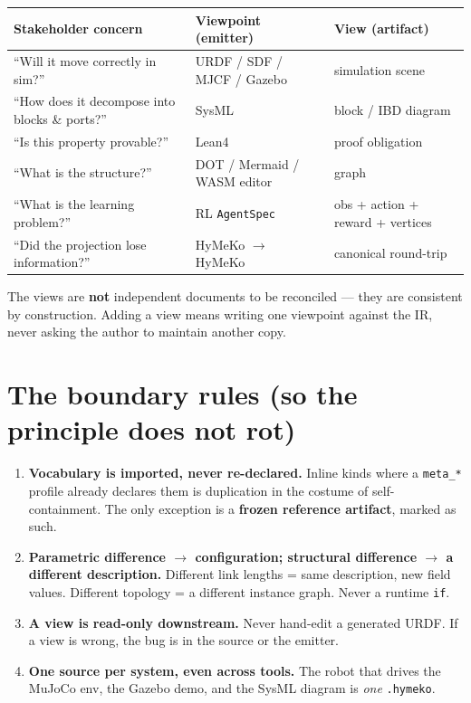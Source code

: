 \documentclass[11pt]{article}
\newcommand{\code}[1]{\texttt{\small #1}}
\begin{document}
\begin{center}\small
\begin{tabular}{@{}p{5.6cm}p{4.0cm}p{4.6cm}@{}}
\toprule
\textbf{Stakeholder concern} & \textbf{Viewpoint (emitter)} & \textbf{View (artifact)} \\
\midrule
``Will it move correctly in sim?'' & URDF / SDF / MJCF / Gazebo & simulation scene \\
``How does it decompose into blocks \& ports?'' & SysML & block / IBD diagram \\
``Is this property provable?'' & Lean4 & proof obligation \\
``What is the structure?'' & DOT / Mermaid / WASM editor & graph \\
``What is the learning problem?'' & RL \code{AgentSpec} & obs + action + reward + vertices \\
``Did the projection lose information?'' & HyMeKo $\to$ HyMeKo & canonical round-trip \\
\bottomrule
\end{tabular}
\end{center}

The views are \textbf{not} independent documents to be reconciled --- they are consistent by
construction. Adding a view means writing one viewpoint against the IR, never asking the author to
maintain another copy.

\section{The boundary rules (so the principle does not rot)}
\begin{enumerate}[nosep]
  \item \textbf{Vocabulary is imported, never re-declared.} Inline kinds where a \code{meta\_*}
        profile already declares them is duplication in the costume of self-containment. The only
        exception is a \textbf{frozen reference artifact}, marked as such.
  \item \textbf{Parametric difference $\to$ configuration; structural difference $\to$ a different
        description.} Different link lengths = same description, new field values. Different topology
        = a different instance graph. Never a runtime \code{if}.
  \item \textbf{A view is read-only downstream.} Never hand-edit a generated URDF. If a view is
        wrong, the bug is in the source or the emitter.
  \item \textbf{One source per system, even across tools.} The robot that drives the MuJoCo env, the
        Gazebo demo, and the SysML diagram is \emph{one} \code{.hymeko}.
\end{enumerate}
\end{document}
